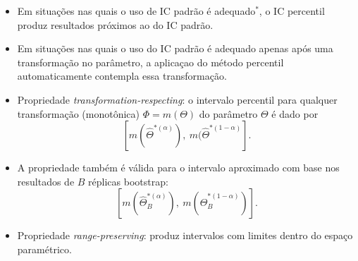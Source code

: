 \documentclass[
  letterpaper,
  DIV=11,
  numbers=noendperiod]{scrreprt}
\begin{document}
\begin{tcolorbox}[enhanced jigsaw, coltitle=black, bottomtitle=1mm, toprule=.15mm, arc=.35mm, colframe=quarto-callout-note-color-frame, breakable, opacityback=0, bottomrule=.15mm, rightrule=.15mm, titlerule=0mm, toptitle=1mm, title=\textcolor{quarto-callout-note-color}{\faInfo}\hspace{0.5em}{Nota}, leftrule=.75mm, opacitybacktitle=0.6, left=2mm, colback=white, colbacktitle=quarto-callout-note-color!10!white]

\begin{itemize}
\item
  Em situações nas quais o uso de IC padrão é adequado\(^*\), o IC
  percentil produz resultados próximos ao do IC padrão.
\item
  Em situações nas quais o uso do IC padrão é adequado apenas após uma
  transformação no parâmetro, a aplicaçao do método percentil
  automaticamente contempla essa transformação.
\end{itemize}

\end{tcolorbox}

\begin{tcolorbox}[enhanced jigsaw, coltitle=black, bottomtitle=1mm, toprule=.15mm, arc=.35mm, colframe=quarto-callout-tip-color-frame, breakable, opacityback=0, bottomrule=.15mm, rightrule=.15mm, titlerule=0mm, toptitle=1mm, title=\textcolor{quarto-callout-tip-color}{\faLightbulb}\hspace{0.5em}{Considerações Finais}, leftrule=.75mm, opacitybacktitle=0.6, left=2mm, colback=white, colbacktitle=quarto-callout-tip-color!10!white]

\begin{itemize}
\item
  Propriedade \textit{transformation-respecting}: o intervalo percentil
  para qualquer transformação (monotônica) \(\Phi=m(\Theta)\) do
  parâmetro \(\Theta\) é dado por
  \[\left[ m(\hat\Theta^{*(\alpha)}), \ m(\hat\Theta^{*(1-\alpha)}\right].\]
\item
  A propriedade também é válida para o intervalo aproximado com base nos
  resultados de \(B\) réplicas bootstrap:
  \[\left[ m(\hat\Theta_B^{*(\alpha)}), \ m(\hat\Theta_B^{*(1-\alpha)})\right].\]
\item
  Propriedade \emph{range-preserving}: produz intervalos com limites
  dentro do espaço paramétrico.
\end{itemize}

\end{tcolorbox}
\end{document}
